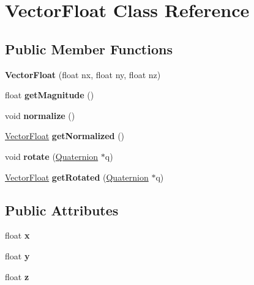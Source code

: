 \hypertarget{class_vector_float}{\section{Vector\+Float Class Reference}
\label{class_vector_float}
}
\subsection*{Public Member Functions}
\begin{DoxyCompactItemize}
\item 
\hypertarget{class_vector_float_a3b12ed03e28bded4316275882433e5aa}{{\bfseries Vector\+Float} (float nx, float ny, float nz)}\label{class_vector_float_a3b12ed03e28bded4316275882433e5aa}

\item 
\hypertarget{class_vector_float_abe0c3954d8da8829a053125df1ce63d5}{float {\bfseries get\+Magnitude} ()}\label{class_vector_float_abe0c3954d8da8829a053125df1ce63d5}

\item 
\hypertarget{class_vector_float_a112eaf8758a6f51b96ed1ccb71700495}{void {\bfseries normalize} ()}\label{class_vector_float_a112eaf8758a6f51b96ed1ccb71700495}

\item 
\hypertarget{class_vector_float_aacb5e7ca59563c47dd066d8b1264ec4b}{\hyperlink{class_vector_float}{Vector\+Float} {\bfseries get\+Normalized} ()}\label{class_vector_float_aacb5e7ca59563c47dd066d8b1264ec4b}

\item 
\hypertarget{class_vector_float_afef0e6d631fb1eb67b6913e90730aa9e}{void {\bfseries rotate} (\hyperlink{class_quaternion}{Quaternion} $\ast$q)}\label{class_vector_float_afef0e6d631fb1eb67b6913e90730aa9e}

\item 
\hypertarget{class_vector_float_ab4093d50e98baf0d98b437a2b3ee7c2e}{\hyperlink{class_vector_float}{Vector\+Float} {\bfseries get\+Rotated} (\hyperlink{class_quaternion}{Quaternion} $\ast$q)}\label{class_vector_float_ab4093d50e98baf0d98b437a2b3ee7c2e}

\end{DoxyCompactItemize}
\subsection*{Public Attributes}
\begin{DoxyCompactItemize}
\item 
\hypertarget{class_vector_float_a2d8e5159f045ca977769d168af75320c}{float {\bfseries x}}\label{class_vector_float_a2d8e5159f045ca977769d168af75320c}

\item 
\hypertarget{class_vector_float_a4affe2a9de97600b3d8df98586679e14}{float {\bfseries y}}\label{class_vector_float_a4affe2a9de97600b3d8df98586679e14}

\item 
\hypertarget{class_vector_float_a54b8e4234e3b48e106d090570755f107}{float {\bfseries z}}\label{class_vector_float_a54b8e4234e3b48e106d090570755f107}

\end{DoxyCompactItemize}


